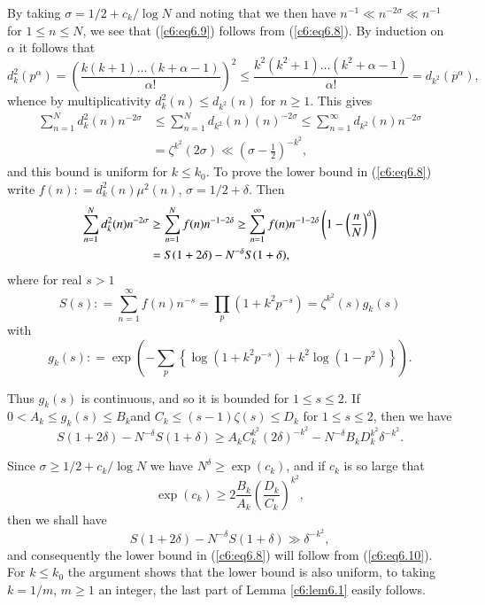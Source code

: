 \medskip
{} By taking $\sigma
=1/2 + c_k / 
\log N$ and noting that we then have $n^{-1} \ll n^{-2\sigma} \ll
n^{-1}$ for $1 \leq n \leq N$, we see that (\ref{c6:eq6.9}) follows
from (\ref{c6:eq6.8}). By induction on $\alpha$ it follows that  
{\fontsize{10}{11}\selectfont
$$
d^2_k (p^\alpha) = \left( \frac{k (k+1) \ldots (k+ \alpha -1)}{\alpha
  !}\right)^2 \leq \frac{k^2 (k^2 +1) \ldots (k^2+ \alpha -1)}{\alpha
  !} = d_{k^2} (p^\alpha), 
$$}
whence by multiplicativity $d^2_k(n) \leq d_{k^2}(n)$ for $n \geq 1$. This gives
\begin{align*}
\sum\limits^{N}_{n=1} d^2_k (n) n^{-2\sigma} & \leq
\sum\limits^N_{n=1} d_{k^2} (n) (n)^{-2\sigma} \leq
\sum\limits^{\infty}_{n=1} d_{k^2} (n) n^{-2\sigma}\\ 
&  = \zeta^{k^2} (2\sigma) \ll \left(\sigma -\frac{1}{2}
\right)^{-k^2}, 
\end{align*}
and this bound is uniform for $k \leq k_0$. To prove the lower bound
in (\ref{c6:eq6.8}) write $f(n) : = d^2_k(n) \mu^2(n)$, $\sigma =1/2 +
\delta$. Then 
\begin{align}
\sum\limits^N_{n=1} d^2_k (n) n^{-2\sigma} & \geq \sum\limits^N_{n=1}
f(n) n^{-1-2\delta} \geq \sum\limits^\infty_{n=1} f(n)n^{-1-2\delta}
\left(1-\left(\frac{n}{N}\right)^{\delta} \right)\notag\\ 
& = S (1+ 2\delta) - N^{-\delta} S (1+\delta),
\label{c6:eq6.10} 
\end{align}
where for real $s >1$
$$
S(s) : = \sum\limits^\infty_{n=1} f(n) n^{-s} = \prod_p \left(1+k^2
p^{-s}\right) = \zeta^{k^2} (s) g_k(s) 
$$
with 
$$
g_k (s) : = \exp \left( -\sum\limits_p  \left\{\log \left(1+k^2
p^{-s}\right) + k^2 \log \left(1-p^2\right) \right\}\right). 
$$

Thus $g_k(s)$ is continuous, and so it is bounded for $1 \leq s \leq
2$. If $0 < A_k \leq g_k (s) \leq B_k$\pageoriginale and $C_k \leq
(s-1) \zeta(s) \leq D_k$ for $1 \leq s \leq 2$, then we have 
$$
S(1+2\delta) - N^{-\delta} S(1+\delta) \geq A_k C^{k^2}_k (2
\delta)^{-k^2} - N^{-\delta} B_k D^{k^2}_k \delta^{-k^2}. 
$$

Since $\sigma \geq 1/2 + c_k / \log N$ we have $N^\delta \geq \exp
(c_k)$, and if $c_k$ is so large that  
$$
\exp (c_k) \geq 2 \frac{B_k}{A_k} \left(\frac{D_k}{C_k}\right)^{k^2},  
$$
then we shall have
$$
S(1+ 2 \delta) - N^{-\delta} S (1+\delta) \gg \delta^{-k^2},
$$
and consequently the lower bound in (\ref{c6:eq6.8}) will follow from
(\ref{c6:eq6.10}). For $k \leq k_0$ the argument shows that the lower
bound is also uniform, to taking $k=1/m$, $m \geq 1$ an integer, the
last part of Lemma \ref{c6:lem6.1} easily follows. 

